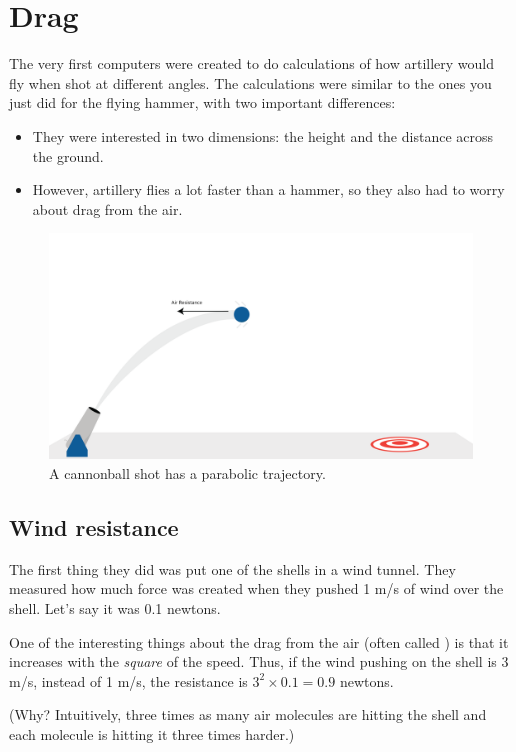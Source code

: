 \chapter{Drag}

The very first computers were created to do calculations of how
artillery would fly when shot at different angles. The calculations
were similar to the ones you just did for the flying
hammer, with two important differences:
\begin{itemize}
\item They were interested in two dimensions: the height and the distance across the ground.
\item However, artillery flies a lot faster than a hammer, so they also had to worry about drag from the air.
\end{itemize}
\begin{figure}[htbp]
    \centering
    \includegraphics[width=1\textwidth]{cannon.png}
    \caption{A cannonball shot has a parabolic trajectory.}
    \label{fig:cannon}
\end{figure}
\section{Wind resistance}

The first thing they did was put one of the shells in a wind tunnel.
They measured how much force was created when they pushed 1 m/s of
wind over the shell. Let's say it was 0.1 newtons.

One of the interesting things about the drag from the air (often
called ) is that it increases with the
\emph{square} of the speed. Thus, if the wind pushing on the shell is
3 m/s, instead of 1 m/s, the resistance is $3^2 \times 0.1 = 0.9$
newtons.

(Why? Intuitively, three times as many air molecules are hitting the
shell and each molecule is hitting it three times harder.)

